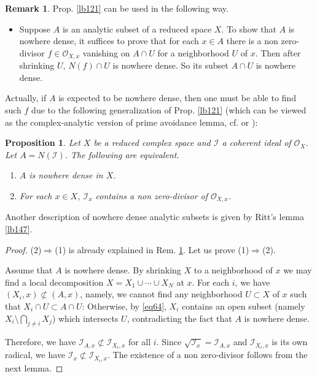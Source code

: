 \documentclass[12pt,b5paper,notitlepage]{report}
\theoremstyle{definition}
\newtheorem{rem}[df]{Remark}
\theoremstyle{plain}
\newtheorem{pp}[df]{Proposition}
\newcommand{\mc}{\mathcal}
\newcommand{\scr}{\mathscr}
\numberwithin{equation}{section}
\begin{document}
\begin{rem}\label{lb122}
Prop. \ref{lb121} can be used in the following way. 
\begin{itemize}
\item Suppose $A$ is an analytic subset of a reduced space $X$. To show that $A$ is nowhere dense, it suffices to prove that for each $x\in A$ there is a non zero-divisor $f\in\scr O_{X,x}$ vanishing on $A\cap U$ for a neighborhood $U$ of $x$. Then after shrinking $U$, $N(f)\cap U$ is nowhere dense. So its subset $A\cap U$ is nowhere dense.
\end{itemize}
Actually, if $A$ is expected to be nowhere dense, then one must be able to find such $f$ due to the following generalization of Prop. \ref{lb121} (which can be viewed as the complex-analytic version of prime avoidance lemma, cf. \cite[Sec. 11.2]{Vak17} or \cite[Sec. 3.2]{Eis}):
\end{rem}



\begin{pp}\label{lb123}
Let $X$ be a reduced complex space and $\mc I$ a coherent ideal of $\scr O_X$. Let $A=N(\mc I)$. The following are equivalent.
\begin{enumerate}[label=(\arabic*)]
\item $A$ is nowhere dense in $X$.
\item For each $x\in X$, $\mc I_x$ contains a non zero-divisor of $\scr O_{X,x}$.
\end{enumerate}
\end{pp}

Another description of nowhere dense analytic subsets is given by Ritt's lemma \ref{lb147}.


\begin{proof}
(2)$\Rightarrow$(1) is already explained in Rem. \ref{lb122}. Let us prove (1)$\Rightarrow$(2).

Assume that $A$ is nowhere dense. By shrinking $X$ to a neighborhood of $x$ we may find a local decomposition $X=X_1\cup\cdots\cup X_N$ at $x$.  For each $i$, we have $(X_i,x)\nsubset(A,x)$, namely, we cannot find any neighborhood $U\subset X$ of $x$ such that $X_i\cap U\subset A\cap U$: Otherwise, by \eqref{eq64}, $X_i$ contains an open subset (namely $X_i\setminus\bigcap_{j\neq i} X_j$) which intersects $U$, contradicting the fact that $A$ is nowhere dense. 

Therefore, we have $\scr I_{A,x}\nsubset \scr I_{X_i,x}$ for all $i$. Since $\sqrt{\mc I_x}=\scr I_{A,x}$ and $\scr I_{X_i,x}$ is its own radical, we have $\mc I_x\nsubset\scr I_{X_i,x}$. The existence of a non zero-divisor follows from the next lemma.
\end{proof}
\end{document}
